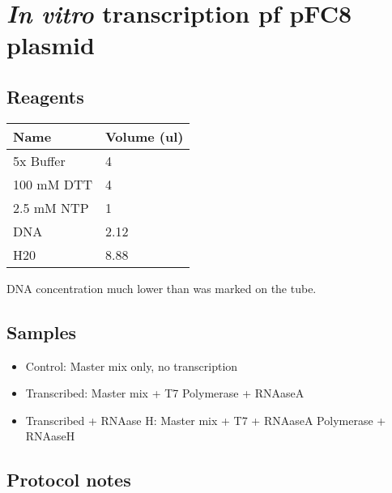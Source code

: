 \documentclass[
]{book}
\author{}
\date{}
\providecommand{\tightlist}{%
  \setlength{\itemsep}{0pt}\setlength{\parskip}{0pt}}
\begin{document}
\frontmatter

\mainmatter
\hypertarget{in-vitro-transcription-pf-pfc8-plasmid}{%
\chapter{\texorpdfstring{\emph{In vitro} transcription pf pFC8
plasmid}{In vitro transcription pf pFC8 plasmid}}\label{in-vitro-transcription-pf-pfc8-plasmid}}

\hypertarget{reagents}{%
\section{Reagents}\label{reagents}}

\begin{longtable}[]{@{}ll@{}}
\toprule
Name & Volume (ul) \\
\midrule
\endhead
5x Buffer & 4 \\
100 mM DTT & 4 \\
2.5 mM NTP & 1 \\
DNA & 2.12 \\
H20 & 8.88 \\
\bottomrule
\end{longtable}

DNA concentration much lower than was marked on the tube.

\hypertarget{samples}{%
\section{Samples}\label{samples}}

\begin{itemize}
\tightlist
\item
  Control: Master mix only, no transcription
\item
  Transcribed: Master mix + T7 Polymerase + RNAaseA
\item
  Transcribed + RNAase H: Master mix + T7 + RNAaseA Polymerase + RNAaseH
\end{itemize}

\hypertarget{protocol-notes}{%
\section{Protocol notes}\label{protocol-notes}}
\end{document}
